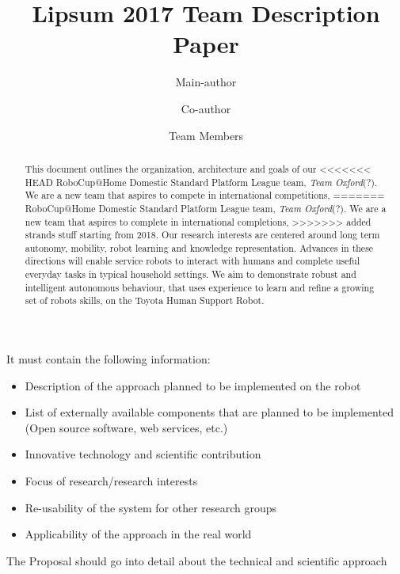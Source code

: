 \documentclass[runningheads,a4paper]{llncs}
\newcommand{\teamori}{Team Oxford}
\begin{document}
\title{Lipsum 2017 Team Description Paper}

\author{Main-author \and Co-author \and Team Members }
\maketitle



\begin{abstract}
This document outlines the organization, architecture and goals of our
<<<<<<< HEAD
RoboCup@Home Domestic Standard Platform League team, \textit{Team Oxford}(?). 
We are a new team that aspires to compete in international competitions,
=======
RoboCup@Home Domestic Standard Platform League team, \textit{\teamori}(?). 
We are a new team that aspires to complete in international completions,
>>>>>>> added strands stuff
starting from 2018. Our research interests are centered around long term
autonomy, mobility, robot learning and knowledge representation. 
Advances in these directions will enable service robots to interact with humans
and complete useful everyday tasks in typical household settings. 
We aim to demonstrate robust and intelligent autonomous behaviour, that uses
experience to learn and refine a growing set of robots skills, on the Toyota
Human Support Robot.

\end{abstract}



It must contain the following information:
\begin{itemize}
    \item Description of the approach planned to be implemented on the robot
    \item List of externally available components that are planned to be
    implemented (Open source software, web services, etc.)
    \item Innovative technology and scientific contribution
    \item Focus of research/research interests
    \item Re-usability of the system for other research groups
    \item Applicability of the approach in the real world
\end{itemize}
The Proposal should go into detail about the technical and scientific approach
\end{document}

